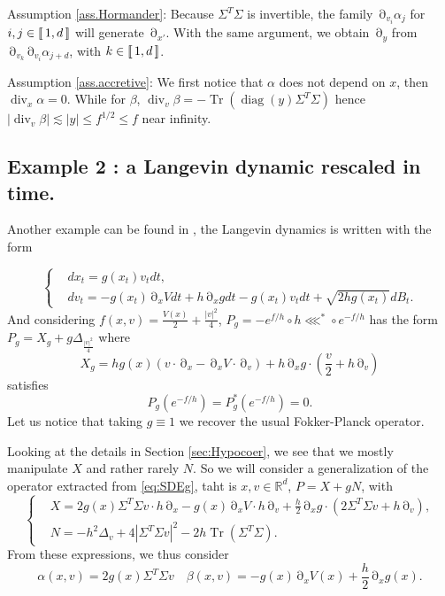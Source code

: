 \documentclass[12pt]{amsart}
\newcommand{\diag}{\operatorname{diag}}
\newcommand{\R}{\mathbb R}
\newcommand{\Tr}{{\operatorname{Tr}}}
\renewcommand{\div}{\operatorname{div}}
\numberwithin{equation}{section}
\numberwithin{figure}{section}
\DeclareMathOperator{\p}{\partial}
\newcommand{\lb}{\operatorname{[\negthinspace [}}
\newcommand{\rb}{\operatorname{]\negthinspace ]}}
\begin{document}
\textbullet Assumption \ref{ass.Hormander}: Because $\Sigma^T\Sigma$ is invertible, the family $\p_{v_i}\alpha_j$ for $i,j\in\lb1,d\rb$ will generate $\p_{x'}$. With the same argument, we obtain $\p_y$ from $\p_{v_k}\p_{v_i}\alpha_{j+d}$, with $k\in\lb1,d\rb$.

\textbullet Assumption \ref{ass.accretive}: We first notice that $\alpha$ does not depend on $x$, then $\div_{x}\alpha = 0$. While for $\beta$, $\div_v\beta = -\Tr(\diag(y)\Sigma^T\Sigma)$ hence $|\div_v\beta| \lesssim |y| \leq f^{1/2}\leq f$ near infinity.










\subsection{Example 2 : a Langevin dynamic rescaled in time.}\label{ssec:exampleRescaled}
Another example can be found in \cite{LeLeLaHi24}, the Langevin dynamics is written with the form

\begin{equation}\label{eq:SDEg}
\left\{
\begin{aligned}
&dx_t = g(x_t)v_tdt,\\
&dv_t = -g(x_t)\p_xVdt + h\p_xgdt - g(x_t)v_tdt + \sqrt{2hg(x_t)}dB_t.
\end{aligned}
\right.
\end{equation}
And considering $f(x,v) = \frac{V(x)}{2} + \frac{|v|^2}{4}$, $P_g = -e^{f/h}\circ h\lll^*\circ e^{-f/h}$ has the form $P_g = X_g + g\Delta_{\frac{|v|^2}{4}}$ where
\begin{equation*}
X_g = hg(x)(v\cdot\p_x - \p_xV\cdot\p_v) + h\p_xg\cdot(\frac{v}{2} + h\p_v)
\end{equation*}
satisfies
\begin{equation*}
P_g(e^{-f/h}) = P_g^*(e^{-f/h}) = 0.
\end{equation*}
Let us notice that taking $g\equiv 1$ we recover the usual Fokker-Planck operator.

Looking at the details in Section \ref{sec:Hypocoer}, we see that we mostly manipulate $X$ and rather rarely $N$. So we will consider a generalization of the operator extracted from \eqref{eq:SDEg}, taht is $x,v\in\R^d$, $P = X + gN$, with
\begin{equation*}
\left\{
\begin{aligned}
&X = 2g(x)\Sigma^T\Sigma v\cdot h\p_x - g(x)\p_xV\cdot h\p_v + \frac h2\p_xg\cdot(2\Sigma^T\Sigma v + h\p_v),\\
&N = -h^2\Delta_v + 4|\Sigma^T\Sigma v|^2 - 2h\Tr(\Sigma^T\Sigma).
\end{aligned}
\right.
\end{equation*}
From these expressions, we thus consider
\begin{equation*}
\alpha(x,v) = 2g(x)\Sigma^T\Sigma v\quad \beta(x,v) = - g(x)\p_xV(x) + \frac h2\p_xg(x).
\end{equation*}
\end{document}
